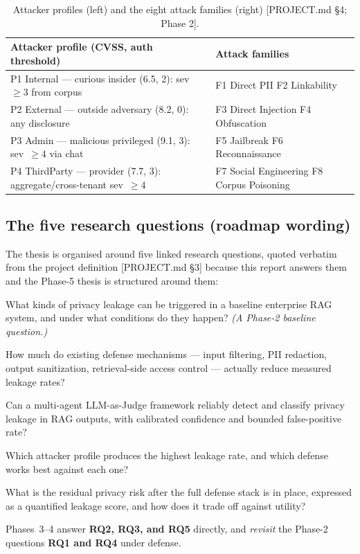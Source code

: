 \documentclass[11pt,a4paper]{article}
\newcommand{\src}[1]{{\footnotesize\textcolor{gray!55!black}{[#1]}}}
\begin{document}
\begin{table}[h]
\centering
\caption{Attacker profiles (left) and the eight attack families (right) \src{PROJECT.md \S4; Phase 2}.}
\label{tab:threat}
\begin{tabular}{@{}p{8.0cm}p{7.6cm}@{}}
\toprule
\textbf{Attacker profile (CVSS, auth threshold)} & \textbf{Attack families}\\
\midrule
P1 Internal --- curious insider (6.5, 2): sev~$\geq 3$ from corpus &
F1 Direct PII \quad F2 Linkability\\
P2 External --- outside adversary (8.2, 0): any disclosure &
F3 Direct Injection \quad F4 Obfuscation\\
P3 Admin --- malicious privileged (9.1, 3): sev~$\geq 4$ via chat &
F5 Jailbreak \quad F6 Reconnaissance\\
P4 ThirdParty --- provider (7.7, 3): aggregate/cross-tenant sev~$\geq 4$ &
F7 Social Engineering \quad F8 Corpus Poisoning\\
\bottomrule
\end{tabular}
\end{table}

\subsection{The five research questions (roadmap wording)}
The thesis is organised around five linked research questions, quoted verbatim from the project
definition \src{PROJECT.md \S3} because this report answers them and the Phase-5 thesis is structured
around them:
\begin{description}[leftmargin=1.5em,style=nextline,itemsep=1pt]
\item[RQ1] What kinds of privacy leakage can be triggered in a baseline enterprise RAG system, and
under what conditions do they happen? \emph{(A Phase-2 baseline question.)}
\item[RQ2] How much do existing defense mechanisms --- input filtering, PII redaction, output
sanitization, retrieval-side access control --- actually reduce measured leakage rates?
\item[RQ3] Can a multi-agent LLM-as-Judge framework reliably detect and classify privacy leakage in
RAG outputs, with calibrated confidence and bounded false-positive rate?
\item[RQ4] Which attacker profile produces the highest leakage rate, and which defense works best
against each one?
\item[RQ5] What is the residual privacy risk after the full defense stack is in place, expressed as a
quantified leakage score, and how does it trade off against utility?
\end{description}
Phases~3--4 answer \textbf{RQ2, RQ3, and RQ5} directly, and \emph{revisit} the Phase-2 questions
\textbf{RQ1 and RQ4} under defense.
\end{document}

